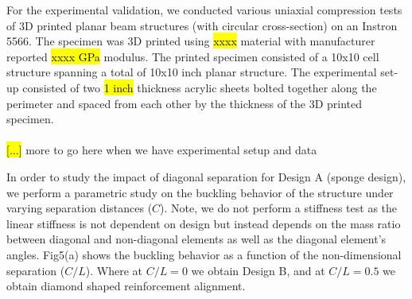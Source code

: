 \documentclass[9pt,twocolumn,twoside]{fernandes_paper}
\newcommand{\mf}[1]{\colorbox{blue!10}{\color{color3}#1}}
\begin{document}
For the experimental validation, we conducted various uniaxial compression tests of 3D printed planar beam structures (with circular cross-section) on an Instron 5566. The specimen was 3D printed using \hl{xxxx} material with manufacturer reported \hl{xxxx GPa} modulus. The printed specimen consisted of a 10x10 cell structure spanning a total of 10x10 inch planar structure. The experimental set-up consisted of two \hl{1 inch} thickness acrylic sheets bolted together along the perimeter and spaced from each other by the thickness of the 3D printed specimen.\\\\\hl{[...]} \mf{more to go here when we have experimental setup and data}



In order to study the impact of diagonal separation for Design A (sponge design), we perform a parametric study on the buckling behavior of the structure under varying separation distances ($C$). Note, we do not perform a stiffness test as the linear stiffness is not dependent on design but instead depends on the mass ratio between diagonal and non-diagonal elements as well as the diagonal element's angles. {Fig5}(a) shows the buckling behavior as a function of the non-dimensional separation ($C/L$). Where at $C/L=0$ we obtain Design B, and at $C/L=0.5$ we obtain diamond shaped reinforcement alignment. 

\end{document}
